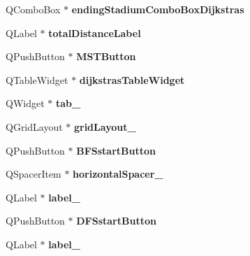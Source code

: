 \begin{DoxyCompactItemize}
Q\+Combo\+Box $\ast$ {\bfseries ending\+Stadium\+Combo\+Box\+Dijkstras}
\item 
\mbox{\label{class_ui___main_window_a3e42cf31133f6fb31d515d9b796b97c7}} 
Q\+Label $\ast$ {\bfseries total\+Distance\+Label}
\item 
\mbox{\label{class_ui___main_window_a022f71e3fc368ec7ce1e1a3a020f999a}} 
Q\+Push\+Button $\ast$ {\bfseries M\+S\+T\+Button}
\item 
\mbox{\label{class_ui___main_window_a903d613fd69c321aa4d62393b1d6b2a5}} 
Q\+Table\+Widget $\ast$ {\bfseries dijkstras\+Table\+Widget}
\item 
\mbox{\label{class_ui___main_window_a83495b23cbc6810f81978dc0d584b810}} 
Q\+Widget $\ast$ {\bfseries tab\+\_}
\item 
\mbox{\label{class_ui___main_window_ad113cf7b76aaf178473555bdf64ff035}} 
Q\+Grid\+Layout $\ast$ {\bfseries grid\+Layout\+\_}
\item 
\mbox{\label{class_ui___main_window_af5155151e977b03494f1110b104082a3}} 
Q\+Push\+Button $\ast$ {\bfseries B\+F\+Sstart\+Button}
\item 
\mbox{\label{class_ui___main_window_a4fc05b11984637298795a354792c4023}} 
Q\+Spacer\+Item $\ast$ {\bfseries horizontal\+Spacer\+\_}
\item 
\mbox{\label{class_ui___main_window_a78c7e10730b43c6700cd7216911ed76a}} 
Q\+Label $\ast$ {\bfseries label\+\_}
\item 
\mbox{\label{class_ui___main_window_a7d149fab4ef6b1172c18d0cc73773113}} 
Q\+Push\+Button $\ast$ {\bfseries D\+F\+Sstart\+Button}
\item 
\mbox{\label{class_ui___main_window_ad6bab8fb8903b8f41afea1218ee52695}} 
Q\+Label $\ast$ {\bfseries label\+\_}
\item 
\mbox{\label{class_ui___main_window_ae4f6eb4c5b87c3f967b47d095d77d886}} 

\end{DoxyCompactItemize}
